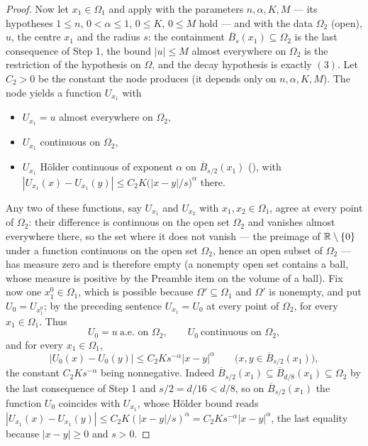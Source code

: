 \begin{proof}
Now let $x_1\in\Omega_1$ and apply  with the
parameters $n,\alpha,K,M$ --- its hypotheses $1\le n$, $0<\alpha\le1$,
$0\le K$, $0\le M$ hold --- and with the data $\Omega_2$ (open), $u$, the
centre $x_1$ and the radius $s$: the containment
$\overline B_s(x_1)\subseteq\Omega_2$ is the last consequence of Step 1, the
bound $|u|\le M$ almost everywhere on $\Omega_2$ is the restriction of the
hypothesis on $\Omega$, and the decay hypothesis is exactly $(3)$.  Let
$C_2>0$ be the constant the node produces (it depends only on $n,\alpha,K,M$).
The node yields a function $U_{x_1}$ with
\begin{itemize}
\item $U_{x_1}=u$ almost everywhere on $\Omega_2$,
\item $U_{x_1}$ continuous on $\Omega_2$,
\item $U_{x_1}$ H\"older continuous of exponent $\alpha$ on
  $\overline B_{s/2}(x_1)$ (), with
  $|U_{x_1}(x)-U_{x_1}(y)|\le C_2K\bigl(|x-y|/s\bigr)^\alpha$ there.
\end{itemize}
Any two of these functions, say $U_{x_1}$ and $U_{x_2}$ with
$x_1,x_2\in\Omega_1$, agree at every point of $\Omega_2$: their difference is
continuous on the open set $\Omega_2$ and vanishes almost everywhere there, so
the set where it does not vanish --- the preimage of $\mathbb{R}\setminus\{0\}$ under
a function continuous on the open set $\Omega_2$, hence an open subset of
$\Omega_2$ --- has measure zero and is therefore empty (a nonempty open set
contains a ball, whose measure is positive by the Preamble item on the volume
of a ball).  Fix now one $x_1^0\in\Omega_1$, which is possible because
$\Omega'\subseteq\Omega_1$ and $\Omega'$ is nonempty, and put
$U_0=U_{x_1^0}$; by the preceding sentence $U_{x_1}=U_0$ at every point of
$\Omega_2$, for every $x_1\in\Omega_1$.  Thus
\[
U_0=u\ \text{a.e. on }\Omega_2,
\qquad U_0\ \text{continuous on }\Omega_2,
\tag{4}
\]
and for every $x_1\in\Omega_1$,
\[
|U_0(x)-U_0(y)|\le C_2Ks^{-\alpha}|x-y|^\alpha
\qquad\bigl(x,y\in\overline B_{s/2}(x_1)\bigr),
\tag{5}
\]
the constant $C_2Ks^{-\alpha}$ being nonnegative.  Indeed
$\overline B_{s/2}(x_1)\subseteq\overline B_{d/8}(x_1)\subseteq\Omega_2$ by
the last consequence of Step 1 and $s/2=d/16<d/8$, so on
$\overline B_{s/2}(x_1)$ the function $U_0$ coincides with $U_{x_1}$, whose
H\"older bound reads
$|U_{x_1}(x)-U_{x_1}(y)|\le C_2K(|x-y|/s)^\alpha=C_2Ks^{-\alpha}|x-y|^\alpha$,
the last equality because $|x-y|\ge0$ and $s>0$.


\end{proof}
